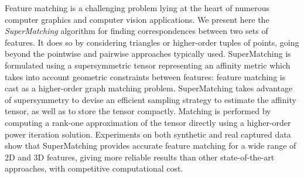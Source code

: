 Feature matching is a challenging problem lying at the heart of numerous computer graphics and computer vision applications.
We present here the \emph{SuperMatching} algorithm for finding correspondences between two sets of features.
It does so by considering triangles or higher-order tuples of points, going beyond the pointwise and pairwise approaches typically used.
SuperMatching is formulated using a supersymmetric tensor representing an affinity metric which takes into account geometric constraints between features:
feature matching is cast as a higher-order graph matching problem.
SuperMatching takes advantage of supersymmetry to devise an
efficient sampling strategy to estimate the affinity tensor, as well as to store the tensor compactly.
Matching is performed by computing a rank-one approximation of the tensor directly using a higher-order power iteration solution.
Experiments on both synthetic and real captured data show that
SuperMatching provides accurate feature matching for a wide range of 2D and 3D features,
giving more reliable results than other state-of-the-art approaches, with competitive computational cost. 